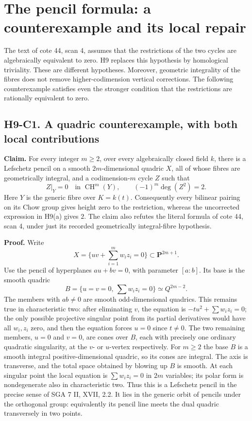 
\section{The pencil formula: a counterexample and its local repair}

The text of cote 44, scan 4, assumes that the restrictions of the two
cycles are algebraically equivalent to zero. H9 replaces this hypothesis by
homological triviality. These are different hypotheses. Moreover, geometric
integrality of the fibres does not remove higher-codimension vertical
corrections. The following counterexample satisfies even the stronger
condition that the restrictions are rationally equivalent to zero.

\subsection*{H9-C1. A quadric counterexample, with both local contributions}

\textbf{Claim.} For every integer $m\geq2$, over every algebraically closed
field $k$, there is a
Lefschetz pencil on a smooth $2m$-dimensional quadric $X$, all of whose fibres
are geometrically integral, and a codimension-$m$ cycle $Z$ such that
\[
 Z|_{Y}=0\quad\text{in }\operatorname{CH}^{m}(Y),\qquad
 (-1)^m\deg(Z^2)=2.
\]
Here $Y$ is the generic fibre over $K=k(t)$. Consequently every
bilinear pairing on its Chow group gives height zero to the restriction,
whereas the uncorrected expression in H9(a) gives $2$. The claim also
refutes the literal formula of cote 44, scan 4, under just its recorded
geometrically integral-fibre hypothesis.

\textbf{Proof.}
Write
\[
 X=\{uv+\textstyle\sum_{i=1}^{m} w_i z_i=0\}
       \subset\mathbf P^{2m+1}.
\]
Use the pencil of hyperplanes $a u+b v=0$, with parameter $[a:b]$.
Its base is the smooth quadric
\[
 B=\{u=v=0,\ \textstyle\sum w_i z_i=0\}\simeq Q^{2m-2}.
\]
The members with $ab\ne0$ are smooth odd-dimensional quadrics. This remains
true in characteristic two: after eliminating $v$, the equation is
$-t u^2+\sum w_i z_i=0$; the only possible projective singular point
from its partial derivatives would have all $w_i,z_i$ zero, and then
the equation forces $u=0$ since $t\ne0$. The two
remaining members, $u=0$ and $v=0$, are cones over $B$, each with precisely
one ordinary quadratic singularity, at the $v$- or $u$-vertex respectively.
For $m\geq2$ the base $B$ is a smooth integral positive-dimensional quadric,
so its cones are integral. The axis is transverse, and the total space
obtained by blowing up $B$ is smooth. At each singular point the local
equation is $\sum w_i z_i=0$ in $2m$ variables; its polar form is
nondegenerate also in characteristic two. Thus this is a Lefschetz pencil in
the precise sense of SGA 7 II, XVII, 2.2. It lies in the generic orbit of
pencils under the orthogonal group: equivalently its pencil line meets the
dual quadric transversely in two points.

